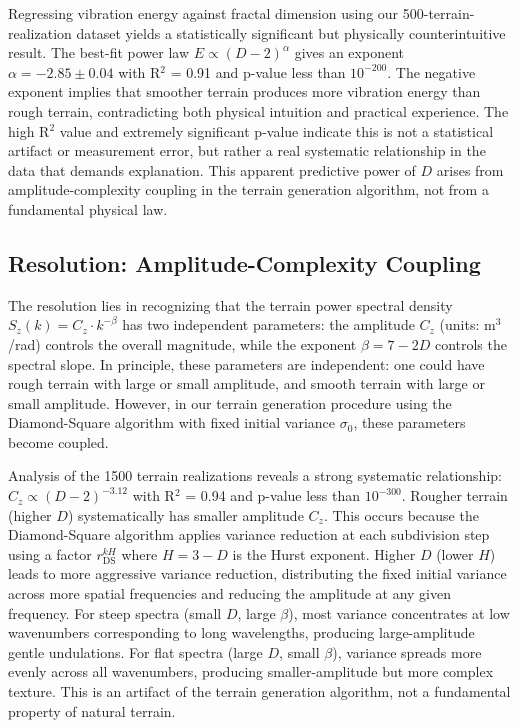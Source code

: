 \documentclass[11pt]{article}
\begin{document}
Regressing vibration energy against fractal dimension using our 500-terrain-realization dataset yields a statistically significant but physically counterintuitive result. The best-fit power law $E \propto (D-2)^\alpha$ gives an exponent $\alpha = -2.85 \pm 0.04$ with R$^2$ = 0.91 and p-value less than $10^{-200}$. The negative exponent implies that smoother terrain produces more vibration energy than rough terrain, contradicting both physical intuition and practical experience. The high R$^2$ value and extremely significant p-value indicate this is not a statistical artifact or measurement error, but rather a real systematic relationship in the data that demands explanation. This apparent predictive power of $D$ arises from amplitude-complexity coupling in the terrain generation algorithm, not from a fundamental physical law.

\subsection{Resolution: Amplitude-Complexity Coupling}

The resolution lies in recognizing that the terrain power spectral density $S_z(k) = C_z \cdot k^{-\beta}$ has two independent parameters: the amplitude $C_z$ (units: m$^3$/rad) controls the overall magnitude, while the exponent $\beta = 7-2D$ controls the spectral slope. In principle, these parameters are independent: one could have rough terrain with large or small amplitude, and smooth terrain with large or small amplitude. However, in our terrain generation procedure using the Diamond-Square algorithm with fixed initial variance $\sigma_0$, these parameters become coupled.

Analysis of the 1500 terrain realizations reveals a strong systematic relationship: $C_z \propto (D-2)^{-3.12}$ with R$^2$ = 0.94 and p-value less than $10^{-300}$. Rougher terrain (higher $D$) systematically has smaller amplitude $C_z$. This occurs because the Diamond-Square algorithm applies variance reduction at each subdivision step using a factor $r_{\text{DS}}^{kH}$ where $H = 3-D$ is the Hurst exponent. Higher $D$ (lower $H$) leads to more aggressive variance reduction, distributing the fixed initial variance across more spatial frequencies and reducing the amplitude at any given frequency. For steep spectra (small $D$, large $\beta$), most variance concentrates at low wavenumbers corresponding to long wavelengths, producing large-amplitude gentle undulations. For flat spectra (large $D$, small $\beta$), variance spreads more evenly across all wavenumbers, producing smaller-amplitude but more complex texture. This is an artifact of the terrain generation algorithm, not a fundamental property of natural terrain.
\end{document}
